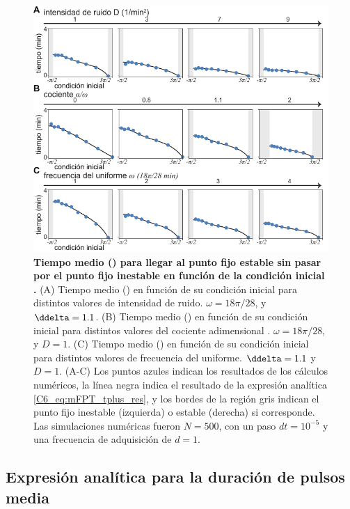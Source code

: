 {\begin{figure}
    \centering
    \includegraphics[width=1\columnwidth]{figures/chapter6/C6_t_plus.pdf} 
    \caption{\textbf{Tiempo medio \tplus(\xx) para llegar al punto fijo estable \xxe sin pasar por el punto fijo inestable \xxi en función de la condición inicial \xx.} (A) Tiempo medio \tplus(\xx) en función de su condición inicial \xx para distintos valores de intensidad de ruido. $\omega = 18\pi/28$, y $\ddelta = 1.1$. (B) Tiempo medio \tplus(\xx) en función de su condición inicial \xx para distintos valores del cociente adimensional \ddelta. $\omega = 18\pi/28$, y $D = 1$. (C) Tiempo medio \tplus(\xx) en función de su condición inicial \xx para  distintos valores de frecuencia del uniforme. $\ddelta = 1.1$ y $D=1$. (A-C) Los puntos azules indican los resultados de los cálculos numéricos, la línea negra indica el resultado de la expresión analítica \ref{C6_eq:mFPT_tplus_res}, y los bordes de la región gris indican el punto fijo inestable (izquierda) o estable (derecha) si corresponde. Las simulaciones numéricas fueron $N=500$, con un paso $dt = 10^{-5}$ y una frecuencia de adquisición de $d=1$.}
    \label{C6_fig:mFPT_tplus}
\end{figure}

\subsection{Expresión analítica para la duración de pulsos media}

}
